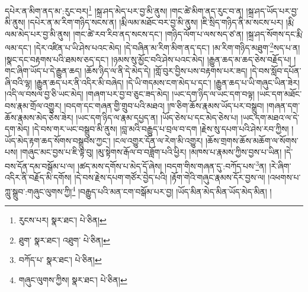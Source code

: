 དཔེར་ན་མིག་ནད་མ་:རུང་བར།\footnote{རུངས་པར།  སྣར་ཐང་།  པེ་ཅིན། } །སྐྲ་ཤད་མེད་པར་བྱ་མི་ནུས། །གང་ཚེ་མིག་ནད་རུང་བ་ན། །སྐྲ་ཤད་ཡོད་པར་བྱ་མི་ནུས། །དཔེར་ན་མ་རིག་གཉིད་སངས་ན། །རྨི་ལམ་མཐོང་བར་བྱ་མི་ནུས། །ཇི་སྲིད་གཉིད་ནི་མ་སངས་པར། །རྨི་ལམ་མེད་པར་བྱ་མི་ནུས། །གང་ཚེ་རབ་རིབ་ནད་སངས་དང་། །གཉིད་ལོག་པ་ལས་སད་ཙ་ན། །སྐྲ་ཤད་སོགས་དང་རྨི་ལམ་དང་། །དེར་འཛིན་པ་ཡི་ཤེས་པའང་མེད། །དེ་བཞིན་མ་རིག་མིག་ནད་དང་། །མ་རིག་གཉིད་མཐུག་\footnote{ཐུག་  སྣར་ཐང་། འཐུག་  པེ་ཅིན། }སད་པ་ན། །སྣང་དང་བརྟགས་པའི་ཐམས་ཅད་དང་། །ཉམས་སུ་མྱོང་བའི་ཤེས་པའང་མེད། །རྒྱུན་ཆད་མ་ཆད་ཅེས་བརྗོད་པ། །གང་ཞིག་ཡོད་པ་དེ་རྒྱུན་ཆད། །ཆོས་ཉིད་ལ་ནི་དེ་མེད་དེ། །གློ་བུར་བྱིས་པས་བརྟགས་པར་ཟད། །དེ་བས་སློབ་དཔོན་ཞི་བའི་ལྷ། །རྒྱུན་ཆད་པར་ནི་འདིར་མི་བཞེད། །དེ་ཡི་གདམས་ངག་མེད་པ་དང་། །རྒྱུན་ཆད་པ་ཡི་གཞུང་ཡིན་ཟེར། །འདི་ལ་བསལ་བྱ་ཅི་ཡང་མེད། །གཞག་པར་བྱ་བ་ཅུང་ཟད་མེད། །ཡང་དག་ཉིད་ལ་ཡང་དག་བལྟ། །ཡང་དག་མཐོང་བས་རྣམ་གྲོལ་འགྱུར། །བདག་དང་གཞན་གྱི་གྲུབ་པའི་མཐའ། །ཁ་ཅིག་ཆོས་རྣམས་ཡོད་པར་བསྒྲུབ། །གཞན་དག་ཆོས་རྣམས་མེད་ཅེས་ཟེར། །ཡང་དག་ཉིད་ལ་རྣམ་དཔྱད་ན། །ཡོད་ཅེས་པ་དང་མེད་ཅེས་པ། །ཡང་དག་མཐའ་ལ་དེ་དག་མེད། །དེ་བས་གར་ཡང་བསྒྲུབ་མི་ནུས། །བླ་མའི་བརྒྱུད་པ་བྲལ་བ་དག །རྗེས་སུ་དཔག་པའི་ཤེས་རབ་ཀྱིས། །ཡོད་མེད་རྟག་ཆད་སོགས་བསྒྲུབས་ཀྱང་། །ངལ་འགྱུར་དོན་ལ་རེག་མི་འགྱུར། །ཆོས་གྲགས་ཆོས་མཆོག་ལ་སོགས་པས། །གཞུང་མང་བྱས་པ་ཇི་ལྟ་བུ། །མུ་སྟེགས་རྒོལ་བ་བཟློག་པའི་ཕྱིར། །མཁས་པ་རྣམས་ཀྱིས་བྱས་པ་ཡིན། །དེ་བས་དོན་དམ་བསྒོམ་པ་ལ། །ཚད་མས་དགོས་པ་མེད་དོ་ཞེས། །བདག་གིས་གཞན་དུ་:བཀོད་པས་\footnote{བཀོད་པ་  སྣར་ཐང་།  པེ་ཅིན། }ན། །རེ་ཞིག་འདིར་ནི་བརྗོད་མི་དགོས། །དེ་བས་རྗེས་དཔག་གཙོར་བྱེད་པའི། །རྟོག་གེའི་གཞུང་རྣམས་དོར་བྱས་ལ། །འཕགས་པ་ཀླུ་སྒྲུབ་:གཞུང་ལུགས་ཀྱི།\footnote{གཞུང་ལུགས་ཀྱིས།  སྣར་ཐང་།  པེ་ཅིན། } །བརྒྱུད་པའི་མན་ངག་བསྒོམ་པར་བྱ། །ཡོད་མིན་མེད་མིན་ཡོད་མེད་མིན། །
